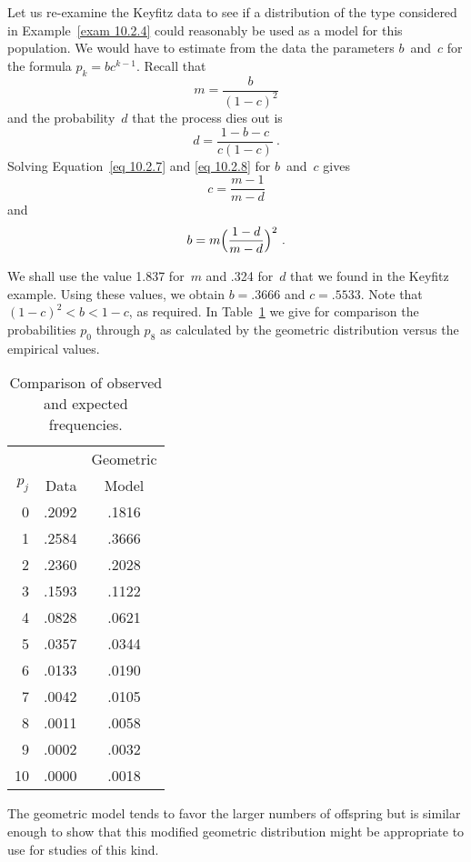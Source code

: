 \begin{example}\label{exam 10.2.4.5}
Let us re-examine the Keyfitz data to see if a distribution of the type
considered in Example~\ref{exam 10.2.4} could reasonably be used as a model for this
population.  We would have to estimate from the data the parameters $b$~and~$c$
for the formula $p_k = bc^{k - 1}$.  Recall that
\begin{equation}
m = \frac b{(1 - c)^2}  
\label{eq 10.2.7}
\end{equation}
and the probability~$d$ that the process dies out is
\begin{equation}
d = \frac{1 - b - c}{c(1 - c)}\ .  \label{eq 10.2.8}
\end{equation}
Solving Equation~\ref{eq 10.2.7} and \ref{eq 10.2.8} for $b$~and~$c$ gives
$$
c = \frac{m - 1}{m - d}
$$
\noindent and
$$
b = m\Bigl(\frac{1 - d}{m - d}\Bigr)^2\ .
$$

We shall use the value 1.837 for~$m$ and .324 for~$d$ that we found in the
Keyfitz example.  Using these values, we obtain $b = .3666$ and $c = .5533$. 
Note that $(1 - c)^2 < b < 1 - c$, as required.  In Table~\ref{table 10.3}
 we give for
comparison the probabilities $p_0$ through $p_8$ as calculated by the geometric
distribution versus the empirical values.
\begin{table}
\centering                                   
\begin{tabular}{rrc}  \hline
    &           & Geometric\\
$p_j$ &Data & Model   \\ \hline
0 & .2092 & .1816 \\
1 & .2584 & .3666 \\
2 & .2360 & .2028 \\
3 & .1593 & .1122 \\
4 & .0828 & .0621 \\
5 & .0357 & .0344 \\
6 & .0133 & .0190 \\
7 & .0042 & .0105 \\
8 & .0011 & .0058 \\
9 & .0002 & .0032 \\
10 & .0000 & .0018 \\\hline
\end{tabular}
\caption{Comparison of observed and expected frequencies.}
\label{table 10.3}
\end{table}
\par
The geometric model tends to favor the larger numbers of offspring but is
similar enough to show that this modified geometric distribution might be
appropriate to use for studies of this kind.


\end{example}

